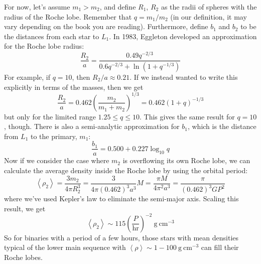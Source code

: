 \documentclass[10pt]{article}
\numberwithin{equation}{section}
\newcommand{\n}{\noindent}
\newcommand{\avg}[1]{\left\langle#1\right\rangle}
\begin{document}
		\n For now, let's assume $m_1>m_2$, and define $R_1$, $R_2$ as the radii of spheres with the radius of the Roche lobe. Remember that $q = m_1/m_2$ (in our definition, it may vary depending on the book you are reading). Furthermore, define $b_1$ and $b_2$ to be the distances from each star to $L_1$. In 1983, Eggleton developed an approximation for the Roche lobe radius:
		\begin{equation}
			\label{eq:binaries:9} \frac{R_2}{a} = \frac{0.49 q^{-2/3}}{0.6 q^{-2/3}+ \ln (1+q^{-1/3})}
		\end{equation}
		For example, if $q=10$, then $R_2/a \approx 0.21$. If we instead wanted to write this explicitly in terms of the masses, then we get
		\begin{equation}
			\label{eq:binaries:10} \frac{R_2}{a} = 0.462\left(\frac{m_2}{m_1+m_2}\right)^{1/3} = 0.462\left(1+q\right)^{-1/3}
		\end{equation}
		but only for the limited range $1.25\leq q \leq 10$. This gives the same result for $q = 10$, though. There is also a semi-analytic approximation for $b_1$, which is the distance from $L_1$ to the primary, $m_1$:
		\begin{equation}
			\label{eq:binaries:11} \frac{b_1}{a} = 0.500 + 0.227\log_{10} q
		\end{equation}
		Now if we consider the case where $m_2$ is overflowing its own Roche lobe, we can calculate the average density inside the Roche lobe by using the orbital period:
		\begin{equation}
			\label{eq:binaries:12} \avg{\rho_2} = \frac{3m_2}{4\pi R_2^3} = \frac{3}{4\pi(0.462)^3a^3}M = \frac{\pi M}{4\pi^2 a^3} = \frac{\pi}{(0.462)^3G P^2}
		\end{equation}
		where we've used Kepler's law to eliminate the semi-major axis. Scaling this result, we get
		\begin{equation}
			\label{eq:binaries:13} \avg{\rho_2} \sim 115 \left(\frac{P}{\mathrm{hr}}\right)^{-2}\ \mathrm{g\ cm^{-3}}
		\end{equation}
		So for binaries with a period of a few hours, those stars with mean densities typical of the lower main sequence with $\avg{\rho}\sim 1 - 100\ \mathrm{g\ cm^{-3}}$ can fill their Roche lobes.
\end{document}
